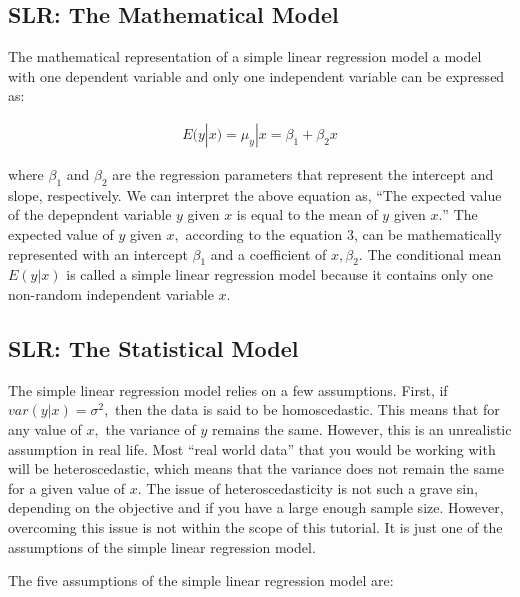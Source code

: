 \documentclass[
]{book}
\begin{document}
\hypertarget{slr-the-mathematical-model}{%
\subsection{SLR: The Mathematical Model}\label{slr-the-mathematical-model}}

The mathematical representation of a simple linear regression model a model with one dependent variable and only one independent variable can be expressed as:

\[
\begin{aligned}
E(y|x)=\mu_y|x=\beta_1+β_2x
\end{aligned}
\]

where \(\beta_1\) and \(\beta_2\) are the regression parameters that represent the intercept and slope, respectively. We can interpret the above equation as, ``The expected value of the depepndent variable \(y\) given \(x\) is equal to the mean of \(y\) given \(x.\)'' The expected value of \(y\) given \(x,\) according to the equation 3, can be mathematically represented with an intercept \(\beta_1\) and a coefficient of \(x, \beta_2.\) The conditional mean \(E(y|x)\) is called a simple linear regression model because it contains only one non-random independent variable \(x.\)

\hypertarget{slr-the-statistical-model}{%
\subsection{SLR: The Statistical Model}\label{slr-the-statistical-model}}

The simple linear regression model relies on a few assumptions. First, if \(var(y|x)=\sigma^2,\) then the data is said to be homoscedastic. This means that for any value of \(x,\) the variance of \(y\) remains the same. However, this is an unrealistic assumption in real life. Most ``real world data'' that you would be working with will be heteroscedastic, which means that the variance does not remain the same for a given value of \(x.\) The issue of heteroscedasticity is not such a grave sin, depending on the objective and if you have a large enough sample size. However, overcoming this issue is not within the scope of this tutorial. It is just one of the assumptions of the simple linear regression model.

The five assumptions of the simple linear regression model are:
\end{document}
